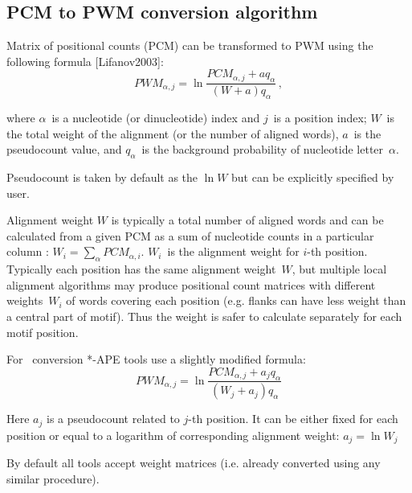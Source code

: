\subsection{PCM to PWM conversion algorithm}
Matrix of positional counts (PCM) can be transformed to PWM using the following formula [Lifanov2003]:
\begin{equation}PWM_{\alpha,j} = \ln\frac{ PCM_{\alpha,j} + aq_{\alpha} }{ (W+a)q_{\alpha} }\,, \end{equation}

where $\alpha$~is a nucleotide (or dinucleotide) index and $j$~is a position index; $W$~is the total weight of the alignment (or the number of aligned words), $a$~is the
pseudocount value, and $q_{\alpha}$~is the background probability of nucleotide letter~$\alpha$.

Pseudocount is taken by default as the $\ln{W}$ but can be explicitly specified by user.

Alignment weight $W$ is typically a total number of aligned words and can be calculated from
 a given PCM as a sum of nucleotide counts in a particular column : $W_i = \sum_{\alpha}PCM_{\alpha,i}$.
 $W_i$~is the alignment weight for \mbox{$i$-th} position.
 Typically each position has the same alignment weight~$W$, but multiple local alignment algorithms may
 produce positional count matrices with different weights~$W_i$ of words covering each position
 (e.g. flanks can have less weight than a central part of motif). Thus the weight is safer to calculate separately for each motif position.

For \PcmToPwm\ conversion *-APE tools use a slightly modified formula:
\begin{equation}PWM_{\alpha,j} = \ln\frac{ PCM_{\alpha,j} + a_j q_{\alpha} }{ (W_j+a_j)q_{\alpha} }\end{equation}

Here $a_j$ is a pseudocount related to \mbox{$j$-th} position.
It can be either fixed for each position or equal to a logarithm of corresponding alignment weight: $a_j=\ln{W_j}$

By default all tools accept weight matrices (i.e. already converted using any similar procedure).
